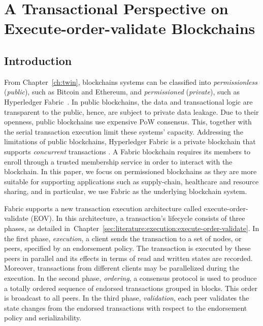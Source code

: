 \chapter{A Transactional Perspective on \\Execute-order-validate Blockchains}
\label{ch:txn}
\section{Introduction}
\label{sec:txn:intro}
From Chapter~\ref{ch:twin}, blockchains systems can be classified into \textit{permissionless}
(\textit{public}), such as Bitcoin and Ethereum, and \textit{permissioned}
(\textit{private}), such as Hyperledger Fabric~\cite{androulaki2018hyperledger}.
%
In public blockchains, the data and transactional logic are transparent to the
public, hence, are subject to private data leakage.
%
Due to their openness, public blockchains use expensive PoW consensus.
%
This, together with the serial transaction execution limit these systems' capacity.
%
Addressing the limitations of public blockchains, Hyperledger Fabric is a
private blockchain that supports \emph{concurrent} transactions
\cite{androulaki2018hyperledger}.
%
A Fabric blockchain requires its members to enroll through a trusted membership service in order to interact with the blockchain.
In this paper, we focus on permissioned blockchains as they are more suitable
for supporting applications such as supply-chain, healthcare and resource
sharing, and in particular, we use Fabric as the underlying blockchain system.

Fabric supports a new transaction execution architecture called
execute-order-validate (EOV).
%
In this architecture, a transaction's lifecycle consists of three phases, as detailed in~Chapter~\ref{sec:literature:execution:execute-order-validate}. In the
first phase, \textit{execution}, a client sends the transaction to a set of
nodes, or peers, specified by an endorsement policy.
%
The transaction is executed by these peers in parallel and its effects in terms
of read and written states are recorded.
%
Moreover, transactions from different clients may be parallelized during the
execution.
%
In the second phase, \textit{ordering}, a consensus protocol is used
to produce a totally ordered sequence of endorsed transactions grouped in
blocks.
%
This order is broadcast to all peers. In the third phase, \textit{validation},
each peer validates the state changes from the endorsed transactions with
respect to the endorsement policy and serializability.

